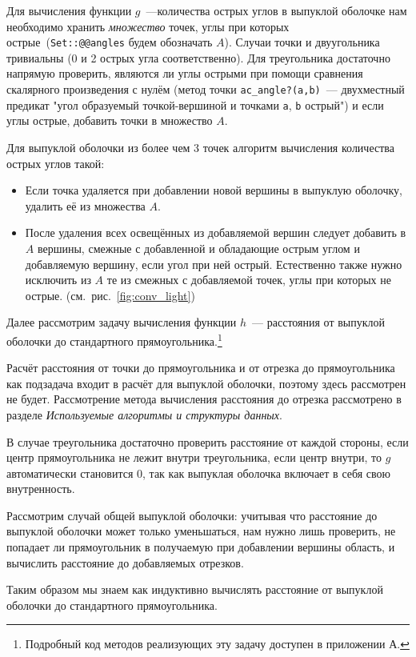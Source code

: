 \newpage

Для вычисления функции $g$~---количества острых углов в выпуклой оболочке нам необходимо хранить \emph{множество} точек, углы при которых острые~(\verb|Set::@@angles| будем обозначать $A$). Случаи точки и двуугольника тривиальны (0 и 2 острых угла соответственно). Для треугольника достаточно напрямую проверить, являются ли углы острыми при помощи сравнения скалярного произведения с нулём (метод точки \verb|ac_angle?(a,b)|~--- двухместный предикат "угол образуемый точкой-вершиной и точками \verb|a|, \verb|b| острый") и если углы острые, добавить точки в множество $A$.

Для выпуклой оболочки из более чем 3 точек алгоритм вычисления количества острых углов такой: 
\begin{itemize}
\item Если точка удаляется при добавлении новой вершины в выпуклую оболочку, удалить её из множества $A$.
\item После удаления всех освещённых из добавляемой вершин следует добавить в $A$ вершины, смежные с добавленной и обладающие острым углом и добавляемую вершину, если угол при ней острый. Естественно также нужно исключить из $A$ те из смежных с добавляемой точек, углы при которых не острые. (см.~рис.~\ref{fig:conv_light})
\end{itemize}

Далее рассмотрим задачу вычисления функции $h$~--- расстояния от выпуклой оболочки до стандартного прямоугольника.\footnote{Подробный код методов реализующих эту задачу доступен в приложении А.} 

Расчёт расстояния от точки до прямоугольника и от отрезка до прямоугольника как подзадача входит в  расчёт для выпуклой оболочки, поэтому здесь рассмотрен не будет. Рассмотрение метода вычисления расстояния до отрезка рассмотрено в разделе \emph{Используемые алгоритмы и структуры данных}. 

В случае треугольника достаточно проверить расстояние от каждой стороны, если центр прямоугольника
 не лежит внутри треугольника, если центр внутри, то $g$ автоматически становится $0$, так как 
 выпуклая оболочка включает в себя свою внутренность.

Рассмотрим случай общей выпуклой оболочки:
учитывая что расстояние до выпуклой оболочки может только уменьшаться, нам нужно лишь проверить, не попадает ли прямоугольник в получаемую при добавлении вершины область, и вычислить расстояние до добавляемых отрезков.

Таким образом мы знаем как индуктивно вычислять расстояние от выпуклой оболочки до стандартного прямоугольника.

